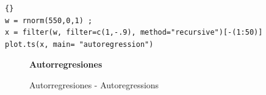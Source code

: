 \begin{lstlisting}[title={‘Código R para generar Autoregresions’},basicstyle=\ttfamily]{}
w = rnorm(550,0,1) ; 
x = filter(w, filter=c(1,-.9), method="recursive")[-(1:50)]
plot.ts(x, main= "autoregression")
\end{lstlisting}\label{autoregression}
\begin{figure}[h]
	\centering
	\textbf{Autorregresiones}\par\medskip
	\caption{Autorregresiones - Autoregressions}\label{figura9}
\end{figure}

